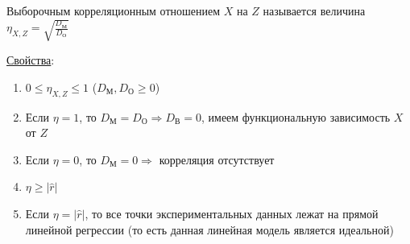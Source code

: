 \Def Выборочным корреляционным отношением $X$ на $Z$ называется величина $\eta_{X, Z} = \sqrt{\frac{D_\text{М}}{D_\text{О}}}$

\underline{Свойства}:

\begin{enumerate}
    \item $0 \leq \eta_{X, Z} \leq 1$ ($D_\text{М}, D_\text{О} \geq 0$)

    \item Если $\eta = 1$, то $D_\text{М} = D_\text{О} \Longrightarrow D_\text{В} = 0$, имеем функциональную зависимость $X$ от $Z$

    \item Если $\eta = 0$, то $D_\text{М} = 0 \Longrightarrow$ корреляция отсутствует

    \item $\eta \geq |\hat r|$

    \item Если $\eta = |\hat r|$, то все точки экспериментальных данных лежат на прямой линейной регрессии 
    (то есть данная линейная модель является идеальной)

\end{enumerate}
